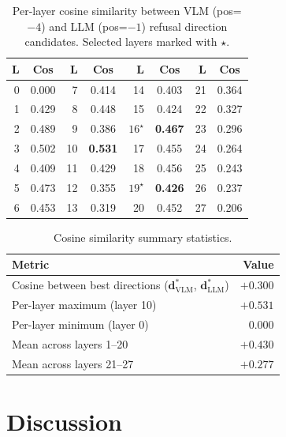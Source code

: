 \documentclass[11pt,a4paper]{article}
\begin{document}
\begin{table}[H]\centering
\caption{Per-layer cosine similarity between VLM (pos=$-4$) and LLM (pos=$-1$) refusal direction candidates. Selected layers marked with $\star$.}
\begin{tabular}{rc|rc|rc|rc}
\toprule
\textbf{L} & \textbf{Cos} & \textbf{L} & \textbf{Cos} & \textbf{L} & \textbf{Cos} & \textbf{L} & \textbf{Cos} \\
\midrule
 0 & 0.000 &  7 & 0.414 & 14 & 0.403 & 21 & 0.364 \\
 1 & 0.429 &  8 & 0.448 & 15 & 0.424 & 22 & 0.327 \\
 2 & 0.489 &  9 & 0.386 & $16^\star$ & \textbf{0.467} & 23 & 0.296 \\
 3 & 0.502 & 10 & \textbf{0.531} & 17 & 0.455 & 24 & 0.264 \\
 4 & 0.409 & 11 & 0.429 & 18 & 0.456 & 25 & 0.243 \\
 5 & 0.473 & 12 & 0.355 & $19^\star$ & \textbf{0.426} & 26 & 0.237 \\
 6 & 0.453 & 13 & 0.319 & 20 & 0.452 & 27 & 0.206 \\
\bottomrule
\end{tabular}
\end{table}

\begin{table}[H]\centering
\caption{Cosine similarity summary statistics.}
\begin{tabular}{lr}
\toprule
\textbf{Metric} & \textbf{Value} \\
\midrule
Cosine between best directions ($\mathbf{d}_\text{VLM}^*$, $\mathbf{d}_\text{LLM}^*$) & $+0.300$ \\
Per-layer maximum (layer 10) & $+0.531$ \\
Per-layer minimum (layer 0) & $0.000$ \\
Mean across layers 1--20 & $+0.430$ \\
Mean across layers 21--27 & $+0.277$ \\
\bottomrule
\end{tabular}
\end{table}

\part{Discussion}

\end{document}
